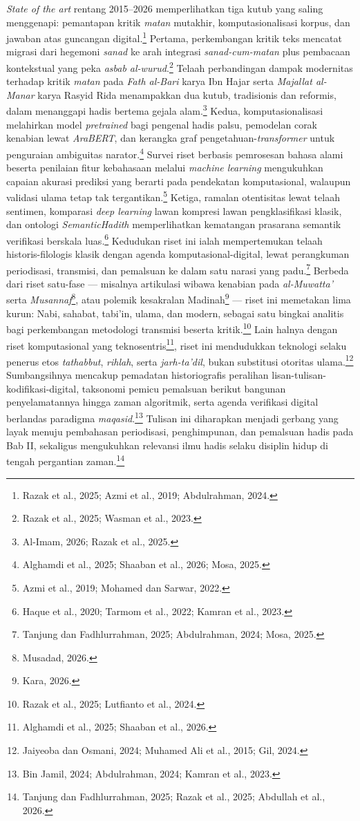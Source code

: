 \textit{State of the art} rentang 2015--2026 memperlihatkan tiga kutub yang saling menggenapi: pemantapan kritik \textit{matan} mutakhir, komputasionalisasi korpus, dan jawaban atas guncangan digital.\footnote{Razak et al., 2025; Azmi et al., 2019; Abdulrahman, 2024.} Pertama, perkembangan kritik teks mencatat migrasi dari hegemoni \textit{sanad} ke arah integrasi \textit{sanad-cum-matan} plus pembacaan kontekstual yang peka \textit{asbab al-wurud}.\footnote{Razak et al., 2025; Wasman et al., 2023.} Telaah perbandingan dampak modernitas terhadap kritik \textit{matan} pada \textit{Fath al-Bari} karya Ibn Hajar serta \textit{Majallat al-Manar} karya Rasyid Rida menampakkan dua kutub, tradisionis dan reformis, dalam menanggapi hadis bertema gejala alam.\footnote{Al-Imam, 2026; Razak et al., 2025.} Kedua, komputasionalisasi melahirkan model \textit{pretrained} bagi pengenal hadis palsu, pemodelan corak kenabian lewat \textit{AraBERT}, dan kerangka graf pengetahuan-\textit{transformer} untuk penguraian ambiguitas narator.\footnote{Alghamdi et al., 2025; Shaaban et al., 2026; Mosa, 2025.} Survei riset berbasis pemrosesan bahasa alami beserta penilaian fitur kebahasaan melalui \textit{machine learning} mengukuhkan capaian akurasi prediksi yang berarti pada pendekatan komputasional, walaupun validasi ulama tetap tak tergantikan.\footnote{Azmi et al., 2019; Mohamed dan Sarwar, 2022.} Ketiga, ramalan otentisitas lewat telaah sentimen, komparasi \textit{deep learning} lawan kompresi lawan pengklasifikasi klasik, dan ontologi \textit{SemanticHadith} memperlihatkan kematangan prasarana semantik verifikasi berskala luas.\footnote{Haque et al., 2020; Tarmom et al., 2022; Kamran et al., 2023.} Kedudukan riset ini ialah mempertemukan telaah historis-filologis klasik dengan agenda komputasional-digital, lewat perangkuman periodisasi, transmisi, dan pemalsuan ke dalam satu narasi yang padu.\footnote{Tanjung dan Fadhlurrahman, 2025; Abdulrahman, 2024; Mosa, 2025.} Berbeda dari riset satu-fase --- misalnya artikulasi wibawa kenabian pada \textit{al-Muwatta'} serta \textit{Musannaf}\footnote{Musadad, 2026.}, atau polemik kesakralan Madinah\footnote{Kara, 2026.} --- riset ini memetakan lima kurun: Nabi, sahabat, tabi'in, ulama, dan modern, sebagai satu bingkai analitis bagi perkembangan metodologi transmisi beserta kritik.\footnote{Razak et al., 2025; Lutfianto et al., 2024.} Lain halnya dengan riset komputasional yang teknosentris\footnote{Alghamdi et al., 2025; Shaaban et al., 2026.}, riset ini mendudukkan teknologi selaku penerus etos \textit{tathabbut}, \textit{rihlah}, serta \textit{jarh-ta'dil}, bukan substitusi otoritas ulama.\footnote{Jaiyeoba dan Osmani, 2024; Muhamed Ali et al., 2015; Gil, 2024.} Sumbangsihnya mencakup pemadatan historiografis peralihan lisan-tulisan-kodifikasi-digital, taksonomi pemicu pemalsuan berikut bangunan penyelamatannya hingga zaman algoritmik, serta agenda verifikasi digital berlandas paradigma \textit{maqasid}.\footnote{Bin Jamil, 2024; Abdulrahman, 2024; Kamran et al., 2023.} Tulisan ini diharapkan menjadi gerbang yang layak menuju pembahasan periodisasi, penghimpunan, dan pemalsuan hadis pada Bab II, sekaligus mengukuhkan relevansi ilmu hadis selaku disiplin hidup di tengah pergantian zaman.\footnote{Tanjung dan Fadhlurrahman, 2025; Razak et al., 2025; Abdullah et al., 2026.}

